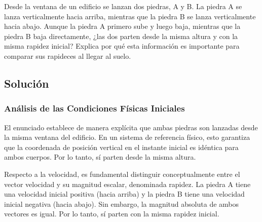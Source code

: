 \documentclass[12pt, a4paper]{article}
\begin{document}
Desde la ventana de un edificio se lanzan dos piedras, A y B. La piedra A se lanza verticalmente hacia arriba, mientras que la piedra B se lanza verticalmente hacia abajo. Aunque la piedra A primero sube y luego baja, mientras que la piedra B baja directamente, ¿las dos parten desde la misma altura y con la misma rapidez inicial? Explica por qué esta información es importante para comparar sus rapideces al llegar al suelo.

\vspace{0.5cm}

\begin{center}
\end{center}

\subsection*{Solución}

\subsubsection*{Análisis de las Condiciones Físicas Iniciales}

El enunciado establece de manera explícita que ambas piedras son lanzadas desde la misma ventana del edificio. En un sistema de referencia físico, esto garantiza que la coordenada de posición vertical en el instante inicial es idéntica para ambos cuerpos. Por lo tanto, sí parten desde la misma altura.

Respecto a la velocidad, es fundamental distinguir conceptualmente entre el vector velocidad y su magnitud escalar, denominada rapidez. La piedra A tiene una velocidad inicial positiva (hacia arriba) y la piedra B tiene una velocidad inicial negativa (hacia abajo). Sin embargo, la magnitud absoluta de ambos vectores es igual. Por lo tanto, sí parten con la misma rapidez inicial.
\end{document}
